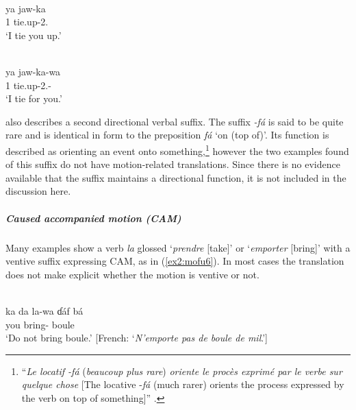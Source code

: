 \ea\label{ex2:mofu3}
 \\
\gll ya jaw-ka \\
1 tie.up-2.	\\
\glt `I tie you up.'

\ex\label{ex2:mofu4}
 \\
\gll ya jaw-ka-wa \\
1 tie.up-2.- \\
\glt `I tie for you.'
\z 


\citet{barreteauDescriptionMofuGudurLangue1983} also describes a second directional verbal suffix. The suffix \textit{-fá} is said to be quite rare and is identical in form to the preposition \textit{fá} `on (top of)'. Its function is described as orienting an event onto something,\footnote{{}``\textit{Le locatif -fá} (\textit{beaucoup plus rare}) \textit{oriente le procès exprimé par le verbe sur quelque chose} [The locative -\textit{fá} (much rarer) orients the process expressed by the verb on top of something]'' \citep[424]{barreteauDescriptionMofuGudurLangue1983}.} however the two examples found of this suffix do not have motion-related translations. Since there is no evidence available that the suffix maintains a directional function, it is not included in the discussion here. 

\subparagraph{Caused accompanied motion (CAM)}

Many examples show a verb \textit{la} glossed `\textit{prendre} [take]' or `\textit{emporter} [bring]' with a ventive suffix expressing CAM, as in (\ref{ex2:mofu6}). In most cases the translation does not make explicit whether the motion is ventive or not. 

\ea\label{ex2:mofu6}
 \\
\gll ka da la-wa ɗáf bá \\
you  bring- boule 	\\
\glt `Do not bring boule.' [French: `\textit{N’emporte pas de boule de mil}.']
\z 

